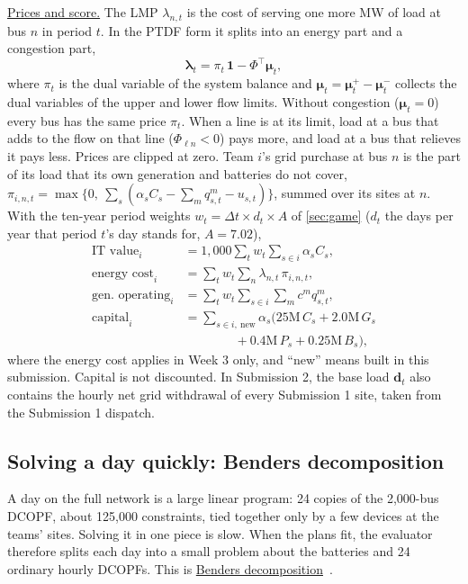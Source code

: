 \documentclass[10pt]{article}
\newcommand{\alert}[1]{{\color{alertblue}\uline{#1}}}
\begin{document}
\alert{Prices and score.} The LMP $\lambda_{n,t}$ is the cost of serving one more
MW of load at bus $n$ in period $t$. In the PTDF form it splits into an energy
part and a congestion part,
\[
  \boldsymbol\lambda_t = \pi_t\,\mathbf 1 - \Phi^{\top} \boldsymbol\mu_t ,
\]
where $\pi_t$ is the dual variable of the system balance and
$\boldsymbol\mu_t = \boldsymbol\mu^{+}_t - \boldsymbol\mu^{-}_t$ collects the
dual variables of the upper and lower flow limits. Without congestion
($\boldsymbol\mu_t = 0$) every bus has the same price $\pi_t$. When a line is
at its limit, load at a bus that adds to the flow on that line
($\Phi_{\ell n} < 0$) pays more, and load at a bus that relieves it pays less.
Prices are clipped at zero. Team $i$'s grid purchase at
bus $n$ is the part of its load that its own generation and batteries do not
cover, $\pi_{i,n,t} = \max\{0,\ \sum_{s} (\alpha_s C_s - \sum_m q^m_{s,t} - u_{s,t})\}$,
summed over its sites at $n$. With the ten-year period weights
$w_t = \Delta t \times d_t \times A$ of \cref{sec:game} ($d_t$ the days per year
that period $t$'s day stands for, $A = 7.02$),
\begin{align*}
  \text{IT value}_i &= 1{,}000 \sum_t w_t \sum_{s \in i} \alpha_s C_s,\\
  \text{energy cost}_i &= \sum_t w_t \sum_n \lambda_{n,t}\, \pi_{i,n,t},\\
  \text{gen.\ operating}_i &= \sum_t w_t \sum_{s \in i} \sum_m c^m q^m_{s,t},\\
  \text{capital}_i &= \sum_{s \in i,\ \text{new}} \alpha_s \big(25\text{M}\,C_s + 2.0\text{M}\,G_s\\
  &\qquad\qquad + 0.4\text{M}\,P_s + 0.25\text{M}\,B_s\big),
\end{align*}
where the energy cost applies in Week 3 only, and ``new'' means built in this
submission. Capital is not discounted. In Submission 2, the base load
$\mathbf d_t$ also contains the hourly net grid withdrawal of every Submission 1
site, taken from the Submission 1 dispatch.

\subsection{Solving a day quickly: Benders decomposition}\label{app:benders}

A day on the full network is a large linear program: 24 copies of the
2{,}000-bus DCOPF, about 125{,}000 constraints, tied together only by a few
devices at the teams' sites. Solving it in one piece is slow. When the plans
fit, the evaluator therefore splits each day into a small problem about the
batteries and 24 ordinary hourly DCOPFs. This is \alert{Benders
decomposition}~\cite{benders1962partitioning}.
\end{document}
